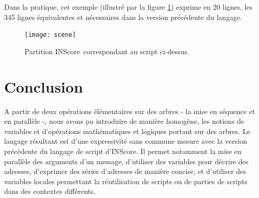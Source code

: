 \documentclass{article}
\newcommand{\IS}		{INScore}
\begin{document}
Dans la pratique, cet exemple (illustré par la figure \ref{samplescene}) exprime en 20 lignes, les 345 lignes équivalentes et nécessaires dans la version précédente du langage.

\begin{figure}[htbp]
\begin{center}
\texttt{[image: scene]}
\caption{Partition \IS\ correspondant au script ci-dessus.}
\label{samplescene}
\end{center}
\end{figure}


\section{Conclusion}

A partir de deux opérations élémentaires sur des arbres - la mise en séquence et en parallèle -, nous avons pu introduire de manière homogène, les notions de variables et d'opérations mathématiques et logiques portant sur des arbres. Le langage résultant est d'une  expressivité sans commune mesure avec la version précédente du langage de script d'\IS . Il permet notamment la mise en parallèle des arguments d'un message, d'utiliser des variables pour décrire des adresses, d'exprimer des séries d'adresses de manière concise, et d'utiliser des variables locales permettant la réutilisation de scripts ou de parties de scripts dans des contextes différents.

\balance


\end{document}
